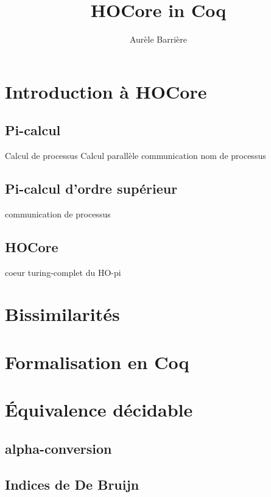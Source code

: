 \documentclass{article}
\title{HOCore in Coq}
\author{Aur\`ele Barri\`ere}
\begin{document}
\maketitle
\tableofcontents

\section{Introduction à HOCore}
\subsection{Pi-calcul}
Calcul de processus
Calcul parallèle
communication nom de processus
\subsection{Pi-calcul d'ordre supérieur}
communication de processus
\subsection{HOCore}
coeur turing-complet du HO-pi
\section{Bissimilarités}

\section{Formalisation en Coq}

\section{Équivalence décidable}
\subsection{alpha-conversion}
\subsection{Indices de De Bruijn}
\end{document}
